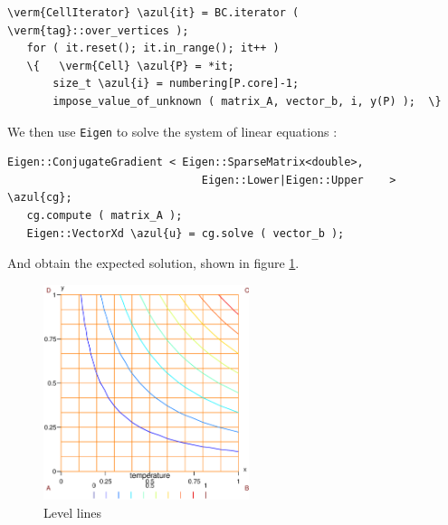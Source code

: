 \begin{Verbatim}[commandchars=\\\{\},formatcom=\small\tt,frame=single,
   label=parag-\ref{\numb section 6.\numb parag 2}.cpp,rulecolor=\color{coment},
   baselinestretch=0.94,framesep=2mm                                            ]
   \verm{CellIterator} \azul{it} = BC.iterator ( \verm{tag}::over_vertices );
   for ( it.reset(); it.in_range(); it++ )
   \{   \verm{Cell} \azul{P} = *it;
       size_t \azul{i} = numbering[P.core]-1;
       impose_value_of_unknown ( matrix_A, vector_b, i, y(P) );  \}
\end{Verbatim}

We then use {\small\tt Eigen} to solve the system of linear equations :

\begin{Verbatim}[commandchars=\\\{\},formatcom=\small\tt,frame=single,
   label=parag-\ref{\numb section 6.\numb parag 2}.cpp,rulecolor=\color{coment},
   baselinestretch=0.94,framesep=2mm                                            ]
   Eigen::ConjugateGradient < Eigen::SparseMatrix<double>,
                              Eigen::Lower|Eigen::Upper    > \azul{cg};
   cg.compute ( matrix_A );
   Eigen::VectorXd \azul{u} = cg.solve ( vector_b );
\end{Verbatim}

And obtain the expected solution, shown in figure \ref{\numb section 6.\numb fig 1}.

\begin{figure} \centering
  \includegraphics[width=60mm]{square-Dirichlet}
  \caption{Level lines}
  \label{\numb section 6.\numb fig 1}
\end{figure}

